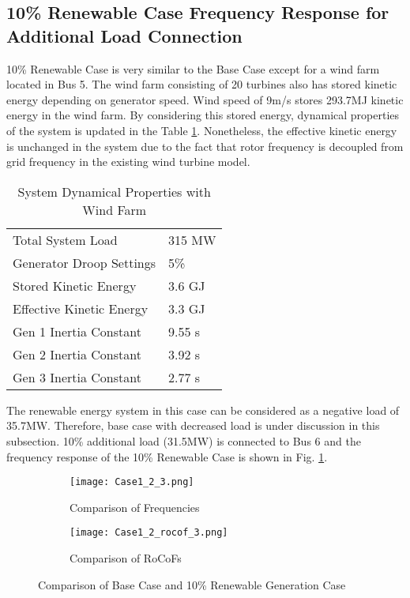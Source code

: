 \subsection{10\% Renewable Case Frequency Response for Additional Load Connection}
10\% Renewable Case is very similar to the Base Case except for a wind farm located in Bus 5. The wind farm consisting of 20 turbines also has stored kinetic energy depending on generator speed. Wind speed of 9m/s stores 293.7MJ kinetic energy in the wind farm. By considering this stored energy, dynamical properties of the system is updated in the Table \ref{systemdynamicaldatamod}. Nonetheless, the effective kinetic energy is unchanged in the system due to the fact that rotor frequency is decoupled from grid frequency in the existing wind turbine model.\par
\begin{table}[h]
	\centering
	\begin{tabular}{ll}
		\hline
		Total System Load                      & 315 MW    \\
		Generator Droop Settings               & 5\%       \\
		Stored Kinetic Energy                  & 3.6 GJ \\
		Effective Kinetic Energy               & 3.3 GJ \\
		Gen 1 Inertia Constant                 & 9.55 s  \\
		Gen 2 Inertia Constant                 & 3.92 s  \\
		Gen 3 Inertia Constant                 & 2.77 s  \\ \hline
	\end{tabular}
	\caption{System Dynamical Properties with Wind Farm}
	\label{systemdynamicaldatamod}
\end{table}
The renewable energy system in this case can be considered as a negative load of 35.7MW. Therefore, base case with decreased load is under discussion in this subsection. 10\% additional load (31.5MW) is connected to Bus 6 and the frequency response of the 10\% Renewable Case is shown in Fig. \ref{Case1_2_freq}. \par
\begin{figure}[h]
	\centering
		\begin{subfigure}{0.9\textwidth} %
			\centering
		\texttt{[image: Case1\_2\_3.png]}
		\caption{Comparison of Frequencies}		
		\label{Case1_2_freq}
		\end{subfigure}
		\vspace{0.1em} %
	\begin{subfigure}{0.9\textwidth}
\centering	\texttt{[image: Case1\_2\_rocof\_3.png]}
	\caption{Comparison of RoCoFs}
	\label{Case1_2_rocof}	
	\end{subfigure}
	\caption{Comparison of Base Case and 10\% Renewable Generation Case}
\end{figure}
